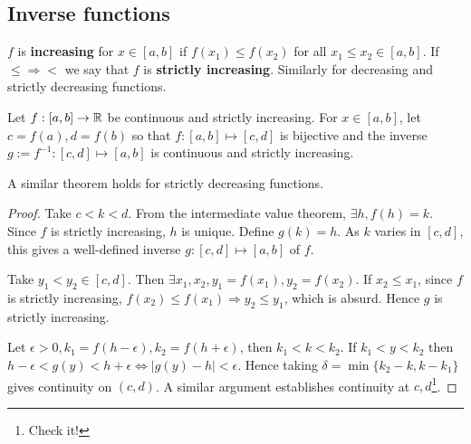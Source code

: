 \subsection{Inverse functions}
\begin{definition}
    $f$ is \textbf{increasing} for $ x\in [a,b] $ if $ f(x_1)\le f(x_2) $ for all $x_1\le x_2\in [a,b]$. If $ \le \Rightarrow < $ we say that $f$ is \textbf{strictly increasing}. Similarly for decreasing and strictly decreasing functions.
\end{definition}

\begin{theorem}\label{thm:existence of inverse function}
    Let $f:[a,b]\to {\mathbb{R}}$ be continuous and strictly increasing. For $ x\in [a,b] $, let $ c=f(a),d=f(b) $ so that $ f:[a,b] \mapsto [c,d] $ is bijective and the inverse $g:=f^{-1}:[c,d]\mapsto [a,b]$ is continuous and strictly increasing. 
\end{theorem}
\begin{remark}
    A similar theorem holds for strictly decreasing functions.
\end{remark}
\begin{proof}
    Take $ c<k<d $. From the intermediate value theorem, $ \exists h,f(h)=k $. Since $f$ is strictly increasing, $h$ is unique. Define $ g(k) = h $. As $k$ varies in $[c,d]$, this gives a well-defined inverse $ g:[c,d] \mapsto [a,b] $ of $f$. 
    
    Take $y_1<y_2\in [c,d]$. Then $ \exists x_1,x_2, y_1=f(x_1),y_2=f(x_2) $. If $ x_2\le x_1 $, since $f$ is strictly increasing, $ f(x_2)\le f(x_1) \Rightarrow y_2\le y_1 $, which is absurd. Hence $g$ is strictly increasing.

    Let $ \epsilon>0,k_1=f(h-\epsilon),k_2=f(h+\epsilon) $, then $ k_1<k<k_2 $. If $ k_1<y<k_2 $ then $ h-\epsilon<g(y)<h+\epsilon \Leftrightarrow |g(y)-h|<\epsilon $. Hence taking $ \delta = \min \{k_2-k,k-k_1\} $ gives continuity on $(c,d)$. A similar argument establishes continuity at $c,d$\footnote{Check it!}.
\end{proof}